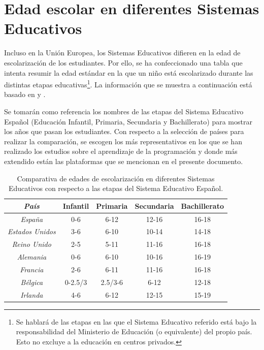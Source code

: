 \appendix

\chapter{Edad escolar en diferentes Sistemas Educativos}\label{anexo:edad-educacion}

Incluso en la Unión Europea, los Sistemas Educativos difieren en la edad de escolarización de los estudiantes. Por ello, se ha confeccionado una tabla que intenta resumir la edad estándar en la que un niño está escolarizado durante las distintas etapas educativas\footnote{Se hablará de las etapas en las que el Sistema Educativo referido está bajo la responsabilidad del Ministerio de Educación (o equivalente) del propio país. Esto no excluye a la educación en centros privados.}. La información que se muestra a continuación está basado en \cite{cursos-educacion-europa} y \cite{guide-education-us}.

Se tomarán como referencia los nombres de las etapas del Sistema Educativo Español (Educación Infantil, Primaria, Secundaria y Bachillerato) para mostrar los años que pasan los estudiantes. Con respecto a la selección de países para realizar la comparación, se escogen los más representativos en los que se han realizado los estudios sobre el aprendizaje de la programación y donde más extendido están las plataformas que se mencionan en el presente documento. 


\begin{table}[!ht]
	\begin{centering}
		\begin{tabular}{c|c|c|c|c}
\emph{País} & Infantil & Primaria & Secundaria & Bachillerato\\
\hline
\emph{España} & 0-6 & 6-12 & 12-16 & 16-18\\
\emph{Estados Unidos} & 3-6 & 6-10 & 10-14 & 14-18\\
\emph{Reino Unido} & 2-5 & 5-11 & 11-16 & 16-18\\
\emph{Alemania} & 0-6 & 6-10 & 10-16 & 16-19\\
\emph{Francia} & 2-6 & 6-11 & 11-16 & 16-18\\
\emph{Bélgica} & 0-2.5/3 & 2.5/3-6 & 6-12 & 12-18\\
\emph{Irlanda} & 4-6 & 6-12 & 12-15 & 15-19\\
\end{tabular}
	\caption{Comparativa de edades de escolarización en diferentes Sistemas Educativos con respecto a las etapas del Sistema Educativo Español.}
		\label{tab:comparativa-tecnicas}
	\end{centering}
\end{table}

